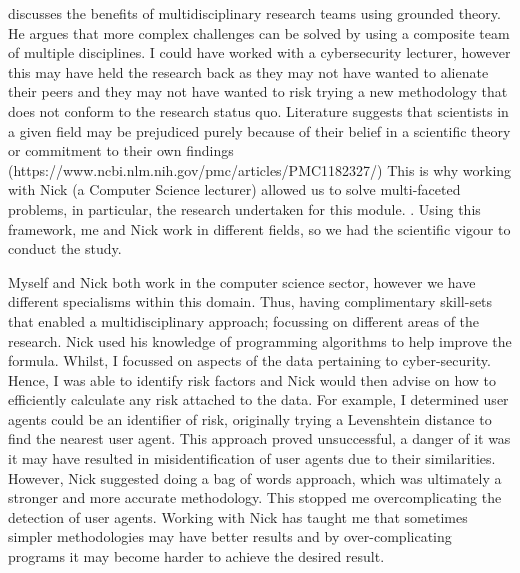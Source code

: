 \cite{thurow1999dynamics} discusses the benefits of multidisciplinary research teams using grounded theory. He argues that more complex challenges can be solved by using a composite team of multiple disciplines. I could have worked with a cybersecurity lecturer, however this may have held the research back as they may not have wanted to alienate their peers and they may not have wanted to risk trying a new methodology that does not conform to the research status quo. Literature suggests that scientists in a given field may be prejudiced purely because of their belief in a scientific theory or commitment to their own findings (https://www.ncbi.nlm.nih.gov/pmc/articles/PMC1182327/) This is why working with Nick (a Computer Science lecturer) allowed us to solve multi-faceted problems, in particular, the research undertaken for this module. 
. Using this framework, me and Nick work in different fields, so we had the scientific vigour to conduct the study.

 Myself and Nick both work in the computer science sector, however we have different specialisms within this domain. Thus, having complimentary skill-sets that enabled a multidisciplinary approach; focussing on different areas of the research. Nick used his knowledge of programming algorithms to help improve the formula. Whilst, I focussed on aspects of the data pertaining to cyber-security. Hence, I was able to identify risk factors and Nick would then advise on how to efficiently calculate any risk attached to the data. For example, I determined user agents could be an identifier of risk,  originally trying a Levenshtein distance to find the nearest user agent. This approach proved unsuccessful, a danger of it was it may have resulted in misidentification of user agents due to their similarities. However, Nick suggested doing a bag of words approach, which was ultimately a stronger and more accurate methodology. This stopped me overcomplicating the detection of user agents. Working with Nick has taught me that sometimes simpler methodologies may have better results and by over-complicating programs it may become harder to achieve the desired result.


